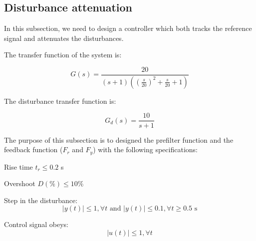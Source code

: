 \subsection{Disturbance attenuation}

In this subsection, we need to design a controller which both tracks the reference signal and attenuates the disturbances.

The transfer function of the system is:

$$G(s) = \frac{20}{(s+1)((\frac{s}{20})^2+\frac{s}{20}+1)}$$

The disturbance transfer function is:

$$G_d(s) = \frac{10}{s+1}$$

The purpose of this subsection is to designed the prefilter function and the feedback function ($F_r$ and $F_y$) with the following specifications:

\begin{shortitemize}
    \item Rise time $t_r \leq 0.2$ s
    \item Overshoot $D(\%) \leq 10\%$
    \item Step in the disturbance:
        $$|y(t)| \leq 1, \forall t \text{ and } |y(t)| \leq 0.1, \forall t \geq 0.5\text{ s}$$ 
    \item Control signal obeys:
        $$|u(t)| \leq 1, \forall t$$
\end{shortitemize}



% 
% 
